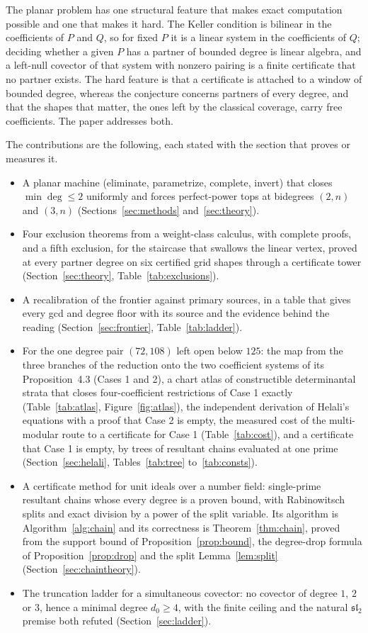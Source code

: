 \documentclass[11pt]{article}
\theoremstyle{remark}
\begin{document}
The planar problem has one structural feature that makes exact computation possible and one
that makes it hard. The Keller condition is bilinear in the coefficients of $P$ and $Q$, so for
fixed $P$ it is a linear system in the coefficients of $Q$; deciding whether a given $P$ has a
partner of bounded degree is linear algebra, and a left-null covector of that system with
nonzero pairing is a finite certificate that no partner exists. The hard feature is that a
certificate is attached to a window of bounded degree, whereas the conjecture concerns partners
of every degree, and that the shapes that matter, the ones left by the classical coverage, carry
free coefficients. The paper addresses both.

The contributions are the following, each stated with the section that proves or measures it.
\begin{itemize}
\item A planar machine (eliminate, parametrize, complete, invert) that closes $\min\deg \le 2$
uniformly and forces perfect-power tops at bidegrees $(2,n)$ and $(3,n)$
(Sections~\ref{sec:methods} and~\ref{sec:theory}).
\item Four exclusion theorems from a weight-class calculus, with complete proofs, and a fifth
exclusion, for the staircase that swallows the linear vertex, proved at every partner degree on
six certified grid shapes through a certificate tower (Section~\ref{sec:theory}, Table~\ref{tab:exclusions}).
\item A recalibration of the frontier against primary sources, in a table that gives every
gcd and degree floor with its source and the evidence behind the reading
(Section~\ref{sec:frontier}, Table~\ref{tab:ladder}).
\item For the one degree pair $(72,108)$ left open below $125$: the map from the three
branches of the reduction onto the two coefficient systems of its Proposition~4.3 (Cases 1 and
2), a chart atlas of constructible determinantal strata that closes four-coefficient restrictions
of Case 1 exactly (Table~\ref{tab:atlas}, Figure~\ref{fig:atlas}), the independent derivation
of Helali's equations with a proof that Case 2 is empty, the measured cost of the multi-modular route to a certificate
for Case 1 (Table~\ref{tab:cost}), and a certificate that Case 1 is empty, by trees of resultant chains evaluated at one prime
(Section~\ref{sec:helali}, Tables~\ref{tab:tree} to~\ref{tab:consts}).
\item A certificate method for unit ideals over a number field: single-prime resultant chains whose every degree is a proven
bound, with Rabinowitsch splits and exact division by a power of the split variable. Its algorithm is Algorithm~\ref{alg:chain}
and its correctness is Theorem~\ref{thm:chain}, proved from the support bound of Proposition~\ref{prop:bound}, the degree-drop formula of
Proposition~\ref{prop:drop} and the split Lemma~\ref{lem:split} (Section~\ref{sec:chaintheory}).
\item The truncation ladder for a simultaneous covector: no covector of degree $1$, $2$ or $3$,
hence a minimal degree $d_0 \ge 4$, with the finite ceiling and the natural $\mathfrak{sl}_2$
premise both refuted (Section~\ref{sec:ladder}).
\end{itemize}
\end{document}
